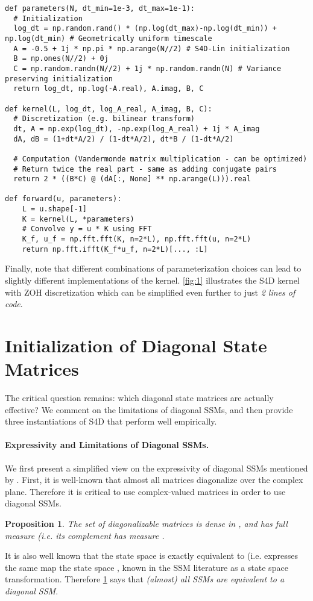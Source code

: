 \documentclass{article}
\newtheorem{proposition}[theorem]{Proposition}
\newcommand{\para}[1]{\paragraph{#1}}
\begin{document}
\begin{listing}[ht]
\begin{verbatim}
def parameters(N, dt_min=1e-3, dt_max=1e-1):
  # Initialization
  log_dt = np.random.rand() * (np.log(dt_max)-np.log(dt_min)) + np.log(dt_min) # Geometrically uniform timescale
  A = -0.5 + 1j * np.pi * np.arange(N//2) # S4D-Lin initialization
  B = np.ones(N//2) + 0j
  C = np.random.randn(N//2) + 1j * np.random.randn(N) # Variance preserving initialization
  return log_dt, np.log(-A.real), A.imag, B, C

def kernel(L, log_dt, log_A_real, A_imag, B, C):
  # Discretization (e.g. bilinear transform)
  dt, A = np.exp(log_dt), -np.exp(log_A_real) + 1j * A_imag
  dA, dB = (1+dt*A/2) / (1-dt*A/2), dt*B / (1-dt*A/2)

  # Computation (Vandermonde matrix multiplication - can be optimized)
  # Return twice the real part - same as adding conjugate pairs
  return 2 * ((B*C) @ (dA[:, None] ** np.arange(L))).real

def forward(u, parameters):
    L = u.shape[-1]
    K = kernel(L, *parameters)
    # Convolve y = u * K using FFT
    K_f, u_f = np.fft.fft(K, n=2*L), np.fft.fft(u, n=2*L)
    return np.fft.ifft(K_f*u_f, n=2*L)[..., :L]

\end{verbatim}
\caption{Full Numpy example of the parameterization and computation of a 1-dimensional S4D-Lin model}
\label{listing}
\end{listing}

Finally, note that different combinations of parameterization choices can lead to slightly different implementations of the kernel.
\cref{fig:1} illustrates the S4D kernel with ZOH discretization which can be simplified even further to just \emph{2 lines of code}.
 \section{Initialization of Diagonal State Matrices}
\label{sec:initialization}

The critical question remains: which diagonal state matrices  are actually effective?
We comment on the limitations of diagonal SSMs,
and then provide three instantiations of S4D that perform well empirically.

\para{Expressivity and Limitations of Diagonal SSMs.}
We first present a simplified view on the expressivity of diagonal SSMs mentioned by \citep{gupta2022diagonal}.
First, it is well-known that almost all matrices diagonalize over the complex plane.
Therefore it is critical to use complex-valued matrices in order to use diagonal SSMs.
\begin{proposition}\label{prop:diagonalize}
  The set  of diagonalizable matrices is dense in , and has full measure (i.e. its complement has measure .
\end{proposition}
It is also well known that the state space  is exactly equivalent to (i.e. expresses the same map  the state space , known in the SSM literature as a state space transformation.
Therefore \cref{prop:diagonalize} says that \emph{(almost) all SSMs are equivalent to a diagonal SSM}.
\end{document}
